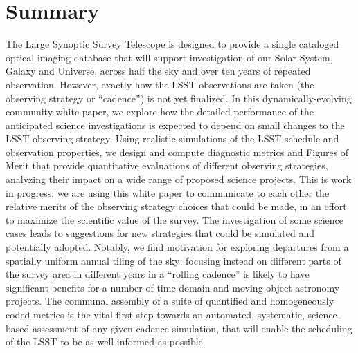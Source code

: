 \setcounter{chapter}{0}
\chapter*{Summary}
\def\chpname{summary}\label{chp:\chpname}
\markboth{}{}


\noindent
The Large Synoptic Survey Telescope is designed to provide a single
cataloged optical imaging database that will support investigation of
our Solar System, Galaxy and Universe, across half the sky and over ten
years of repeated observation.
%
However, exactly how the LSST observations are taken (the observing strategy or ``cadence'') is not yet finalized.
%
In this dynamically-evolving community white paper, we explore how the
detailed performance of the anticipated science investigations is
expected to depend on small changes to the LSST observing strategy.
%
Using realistic simulations of the LSST schedule and observation
properties, we design and compute diagnostic metrics and Figures of
Merit that provide quantitative evaluations of different observing
strategies, analyzing their impact on a wide range of proposed science
projects.
%
This is work in progress: we are using this white paper to communicate
to each other the relative merits of the observing strategy choices that
could be made, in an effort to maximize the scientific value of the
survey.
%
The investigation of some science cases leads to suggestions for new
strategies that could be simulated and potentially adopted.
%
Notably, we find motivation for exploring departures from a spatially
uniform annual tiling of the sky: focusing instead on different parts of
the survey area in different years in a ``rolling cadence'' is likely to
have significant benefits for a number of time domain and moving object
astronomy projects.
%
The communal assembly of a suite of quantified and homogeneously coded
metrics is the vital first step towards an automated, systematic,
science-based assessment of any given cadence simulation, that will
enable the scheduling of the LSST to be as well-informed as possible.

\clearpage
